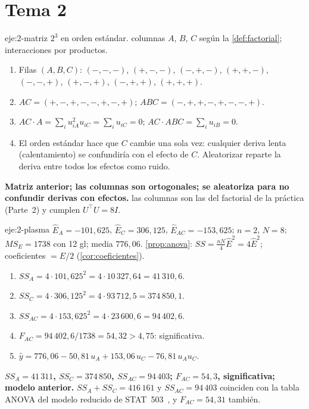 \section{Tema 2}

\begin{solucion}{eje:2-matriz}
\datos $2^3$ en orden estándar.
\planteamiento columnas $A$, $B$, $C$ según la \cref{def:factorial}; interacciones por productos.
\pasos
\begin{enumerate}[label=\arabic*.]
  \item Filas $(A,B,C)$: $(-,-,-)$, $(+,-,-)$, $(-,+,-)$, $(+,+,-)$, $(-,-,+)$, $(+,-,+)$, $(-,+,+)$, $(+,+,+)$.
  \item $AC=(+,-,+,-,-,+,-,+)$; $ABC=(-,+,+,-,+,-,-,+)$.
  \item $AC\cdot A=\sum_iu_{iA}^2u_{iC}=\sum_iu_{iC}=0$; $AC\cdot ABC=\sum_iu_{iB}=0$.
  \item El orden estándar hace que $C$ cambie una sola vez: cualquier deriva lenta (calentamiento) se confundiría con el efecto de $C$. Aleatorizar reparte la deriva entre todos los efectos como ruido.
\end{enumerate}
\resultado \textbf{Matriz anterior; las columnas son ortogonales; se aleatoriza para no confundir derivas con efectos.}
\comprobacion las columnas son las del factorial de la práctica (Parte~2) y cumplen $U^\top U=8I$.
\end{solucion}

\begin{solucion}{eje:2-plasma}
\datos $\hat E_A=-101{,}625$, $\hat E_C=306{,}125$, $\hat E_{AC}=-153{,}625$; $n=2$, $N=8$; $MS_E=1738$ con 12 gl; media $776{,}06$.
\planteamiento \cref{prop:anova}: $SS=\frac{nN}{4}\hat E^2=4\hat E^2$; coeficientes $=\hat E/2$ (\cref{cor:coeficientes}).
\pasos
\begin{enumerate}[label=\arabic*.]
  \item $SS_A=4\cdot101{,}625^2=4\cdot10\,327{,}64=41\,310{,}6$.
  \item $SS_C=4\cdot306{,}125^2=4\cdot93\,712{,}5=374\,850{,}1$.
  \item $SS_{AC}=4\cdot153{,}625^2=4\cdot23\,600{,}6=94\,402{,}6$.
  \item $F_{AC}=94\,402{,}6/1738=54{,}32>4{,}75$: significativa.
  \item $\hat y=776{,}06-50{,}81\,u_A+153{,}06\,u_C-76{,}81\,u_Au_C$.
\end{enumerate}
\resultado \textbf{$SS_A=41\,311$, $SS_C=374\,850$, $SS_{AC}=94\,403$; $F_{AC}=54{,}3$, significativa; modelo anterior.}
\comprobacion $SS_A+SS_C=416\,161$ y $SS_{AC}=94\,403$ coinciden con la tabla ANOVA del modelo reducido de STAT~503~\cite{psu503}, y $F_{AC}=54{,}31$ también.
\end{solucion}

